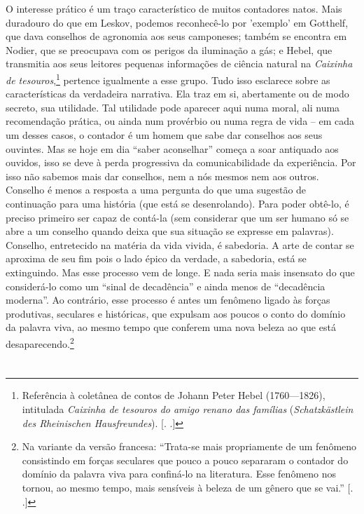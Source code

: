 O interesse prático é um traço característico de muitos contadores
natos. Mais duradouro do que em Leskov, podemos reconhecê-lo por 'exemplo'
em Gotthelf, que dava conselhos de agronomia aos seus camponeses; também
se encontra em Nodier, que se preocupava com os perigos da iluminação a
gás; e Hebel, que transmitia aos seus leitores pequenas informações de
ciência natural na \emph{Caixinha de tesouros},\footnote{Referência à
  coletânea de contos de Johann Peter Hebel (1760---1826), intitulada
  \emph{Caixinha de tesouros do amigo renano das famílias}
  (\emph{Schatzkästlein des Rheinischen Hausfreundes}). [. .]}
pertence igualmente a esse grupo. Tudo isso esclarece sobre as
características da verdadeira narrativa. Ela traz em si, abertamente ou
de modo secreto, sua utilidade. Tal utilidade pode aparecer aqui numa
moral, ali numa recomendação prática, ou ainda num provérbio ou numa
regra de vida -- em cada um desses casos, o contador é um homem que sabe
dar conselhos aos seus ouvintes. Mas se hoje em dia ``saber aconselhar''
começa a soar antiquado aos ouvidos, isso se deve à perda progressiva da
comunicabilidade da experiência. Por isso não sabemos mais dar
conselhos, nem a nós mesmos nem aos outros. Conselho é menos a resposta
a uma pergunta do que uma sugestão de continuação para uma história (que
está se desenrolando). Para poder obtê-lo, é preciso primeiro ser capaz
de contá-la (sem considerar que um ser humano só se abre a um conselho
quando deixa que sua situação se expresse em palavras). Conselho,
entretecido na matéria da vida vivida, é sabedoria. A arte de contar se
aproxima de seu fim pois o lado épico da verdade\label{supra2}, a sabedoria, está se
extinguindo. Mas esse processo vem de longe. E nada seria mais insensato
do que considerá-lo como um ``sinal de decadência'' e ainda menos de
``decadência moderna''. Ao contrário, esse processo é antes um fenômeno
ligado às forças produtivas, seculares e históricas, que expulsam aos
poucos o conto do domínio da palavra viva, ao mesmo tempo que conferem
uma nova beleza ao que está desaparecendo.\footnote{Na variante da
  versão francesa: ``Trata-se mais propriamente de um fenômeno
  consistindo em forças seculares que pouco a pouco separaram o contador
  do domínio da palavra viva para confiná-lo na literatura. Esse
  fenômeno nos tornou, ao mesmo tempo, mais sensíveis à beleza de um
  gênero que se vai.'' [. .]}

\section{}

